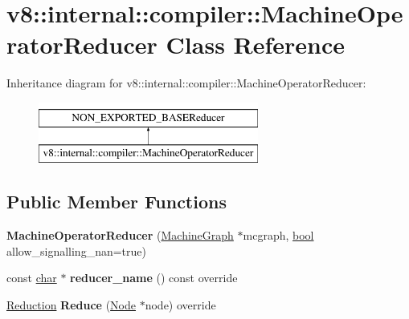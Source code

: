 \hypertarget{classv8_1_1internal_1_1compiler_1_1MachineOperatorReducer}{}\section{v8\+:\+:internal\+:\+:compiler\+:\+:Machine\+Operator\+Reducer Class Reference}
\label{classv8_1_1internal_1_1compiler_1_1MachineOperatorReducer}
Inheritance diagram for v8\+:\+:internal\+:\+:compiler\+:\+:Machine\+Operator\+Reducer\+:\begin{figure}[H]
\begin{center}
\leavevmode
\includegraphics[height=2.000000cm]{classv8_1_1internal_1_1compiler_1_1MachineOperatorReducer}
\end{center}
\end{figure}
\subsection*{Public Member Functions}
\begin{DoxyCompactItemize}
\item 
\mbox{\label{classv8_1_1internal_1_1compiler_1_1MachineOperatorReducer_a0b8498dbe8143c00b11b835be3213763}} 
{\bfseries Machine\+Operator\+Reducer} (\mbox{\hyperlink{classv8_1_1internal_1_1compiler_1_1MachineGraph}{Machine\+Graph}} $\ast$mcgraph, \mbox{\hyperlink{classbool}{bool}} allow\+\_\+signalling\+\_\+nan=true)
\item 
\mbox{\label{classv8_1_1internal_1_1compiler_1_1MachineOperatorReducer_abe0f93a798cbbcaef108407bcdbe0a4e}} 
const \mbox{\hyperlink{classchar}{char}} $\ast$ {\bfseries reducer\+\_\+name} () const override
\item 
\mbox{\label{classv8_1_1internal_1_1compiler_1_1MachineOperatorReducer_ab8422c43e957c6b10d62ec01c9a8ab50}} 
\mbox{\hyperlink{classv8_1_1internal_1_1compiler_1_1Reduction}{Reduction}} {\bfseries Reduce} (\mbox{\hyperlink{classv8_1_1internal_1_1compiler_1_1Node}{Node}} $\ast$node) override
\end{DoxyCompactItemize}


